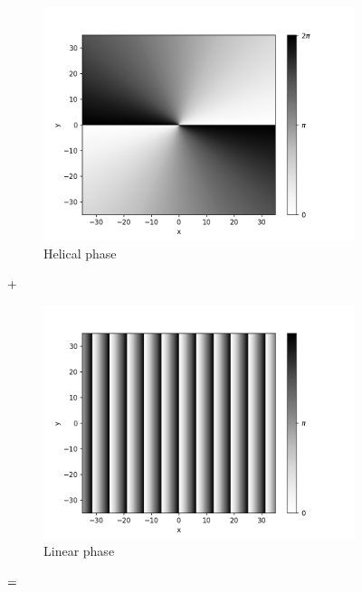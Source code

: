 \documentclass[11pt,a4paper]{article}
\numberwithin{equation}{section}
\begin{document}
\begin{figure}[H]
	\begin{subfigure}[H]{0.31\textwidth}
		\centering
		\includegraphics[width=\textwidth]{cgh_hel.png}
		\caption{Helical phase}
		\label{fig:cgh,lin}
	\end{subfigure}
	\hfil $\centering+$
	\begin{subfigure}[H]{0.31\textwidth}
		\centering
		\includegraphics[width=\textwidth]{cgh_lin.png}
		\caption{Linear phase}
		\label{fig:cgh,hel}
	\end{subfigure}
	\hfil $\centering=$
	\begin{subfigure}[H]{0.31\textwidth}
		\centering

\end{subfigure}
\end{figure}
\end{document}
